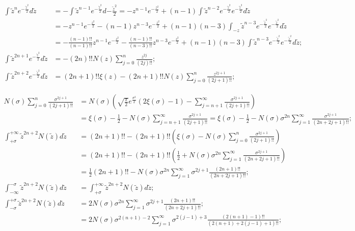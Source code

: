 \documentclass[twoside]{article}
\numberwithin{equation}{section}
\begin{document}
\begin{align*}
\int \tilde{z}^{n} e^{-\frac{\tilde{z}^2}{2}} d \tilde{z} &= -\int \tilde{z}^{n - 1} e^{-\frac{\tilde{z}^2}{2}} d {-\frac{\tilde{z}^2}{2}}
  = - z^{n-1} e^{-\frac{z^2}{2}} + (n-1) \int \tilde{z}^{n-2} e^{-\frac{\tilde{z}^2}{2}} e^{-\frac{\tilde{z}^2}{2}} d \tilde{z} \\
 &= - z^{n-1} e^{-\frac{z^2}{2}} - (n-1) z^{n-3} e^{-\frac{z^2}{2}} 
  + (n-1) (n-3) \int_{-z} \tilde{z}^{n -3} e^{-\frac{\tilde{z}^2}{2}} e^{-\frac{\tilde{z}^2}{2}} d \tilde{z} \\
 &= - \frac{(n-1)!!}{(n-1)!!} z^{n-1} e^{-\frac{z^2}{2}} - \frac{(n-1)!!}{(n-3)!!} z^{n-3} e^{-\frac{z^2}{2}} 
  + (n-1) (n-3) \int \tilde{z}^{n -3} e^{-\frac{\tilde{z}^2}{2}} e^{-\frac{\tilde{z}^2}{2}} d \tilde{z}; \\
\int \tilde{z}^{2n + 1} e^{-\frac{\tilde{z}^2}{2}} d \tilde{z} &= - (2n)!! N(z) \sum_{j=0}^{n} \frac{z^{2j}}{(2j)!!}; \\
\int \tilde{z}^{2n + 2} e^{-\frac{\tilde{z}^2}{2}} d \tilde{z} &= (2n + 1)!! \xi(z) - (2n + 1)!! N(z) \sum_{j=0}^{n} \frac{z^{2j + 1}}{(2j + 1)!!};
\end{align*}

\begin{align*}
N(\sigma) \sum_{j=0}^{n} \frac{\sigma^{2j+1}}{(2j+1)!!} 
 & = N(\sigma) \left( \sqrt{\frac{\pi}{2}} e^{\frac{\sigma^2}{2}} (2 \xi(\sigma) - 1) - \sum_{j=n+1}^{\infty} \frac{\sigma^{2j+1}}{(2j+1)!!} \right) \\
 &= \xi(\sigma) - \frac{1}{2} - N(\sigma) \sum_{j=n+1}^{\infty} \frac{\sigma^{2j+1}}{(2j+1)!!} 
  = \xi(\sigma) - \frac{1}{2} - N(\sigma) \sigma^{2n} \sum_{j=1}^{\infty} \frac{\sigma^{2j+1}}{(2n + 2j+1)!!}; \\
\int_{+\sigma}^{+\infty} \tilde{z}^{2n + 2} N(\tilde{z}) d \tilde{z} 
 &= (2n+1)!! - (2n+1)!! \left(\xi(\sigma) - N(\sigma) \sum_{j=0}^{n} \frac{\sigma^{2j + 1}}{(2j + 1)!!} \right) \\
 &= (2n+1)!! - (2n+1)!! \left(\frac{1}{2} + N(\sigma) \sigma^{2n} \sum_{j=1}^{\infty} \frac{\sigma^{2j+1}}{(2n + 2j+1)!!} \right) \\
 &= \frac{1}{2} (2n+1)!! - N(\sigma) \sigma^{2n} \sum_{j=1}^{\infty} \sigma^{2j+1} \frac{(2n+1)!!}{(2n + 2j+1)!!}; \\
\int_{-\infty}^{-\sigma} \tilde{z}^{2n + 2} N(\tilde{z}) d \tilde{z} &= \int_{+\sigma}^{+\infty} \tilde{z}^{2n + 2} N(\tilde{z}) d \tilde{z}; \\
\int_{-\sigma}^{+\sigma} \tilde{z}^{2n + 2} N(\tilde{z}) d \tilde{z} &= 2 N(\sigma) \sigma^{2n} \sum_{j=1}^{\infty} \sigma^{2j+1} \frac{(2n+1)!!}{(2n + 2j+1)!!}; \\
 &= 2 N(\sigma) \sigma^{2(n+1)-2} \sum_{j=1}^{\infty} \sigma^{2(j-1) + 3} \frac{(2(n+1)-1)!!}{(2(n+1) + 2(j-1) + 1)!!};
\end{align*}
\end{document}
